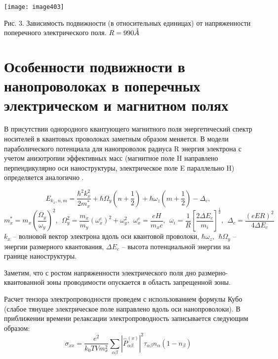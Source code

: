 \texttt{[image: image403]}

\noindent Рис. 3. Зависимость подвижности (в относительных единицах) от напряженности поперечного электрического поля. $R=990 \AA$



\section{Особенности подвижности в нанопроволоках в поперечных электрическом и магнитном полях} \label{sect4_3}

В присутствии однородного квантующего магнитного поля энергетический спектр носителей в квантовых проволоках заметным образом меняется. В модели параболического потенциала для нанопроволок радиуса R энергия электрона с учетом анизотропии эффективных масс (магнитное поле H  направлено перпендикулярно оси наноструктуры, электрическое поле E параллельно H) определяется аналогично \cite{Geiler1998}.

\begin{equation} \label{eq:43_10}
	E_{k_x,n,m}=\frac{{\hbar }^2k^2_x}{2m^*_x}+\hbar {\Omega }_y\left(n+\frac{1}{2}\right)+\hbar {\omega }_z\left(m+\frac{1}{2}\right)-{\Delta }_c,   
\end{equation}
\[
m^*_x=m_x{\left(\frac{{\Omega }_y}{{\omega }_y}\right)}^2,\ \ {\Omega }^2_y=\frac{m_x}{m_y}{\left({\omega }^c_x\right)}^2+{\omega }^2_y,\ \ {\omega }^c_x=\frac{eH}{m_xc},\ \ {\omega }_i=\frac{1}{R}{\left[\frac{2\Delta E_c}{m_i}\right]}^{\frac{1}{2}},\ \ {\Delta }_c=\frac{{\left(eER\right)}^2}{4\Delta E_c}
\]
$k_x$ -- волновой вектор электрона вдоль оси квантовой проволоки, $\hbar {\omega }_z,\ \ \hbar {\Omega }_y$ -- энергии размерного квантования, $\Delta E_c$ -- высота потенциальной энергии на границе наноструктуры.

Заметим, что с ростом напряженности электрического поля дно размерно-квантованной зоны проводимости опускается в область запрещенной зоны.

Расчет тензора электропроводности проведем с использованием формулы Кубо
\cite{Kubo1957a} (слабое тянущее электрическое поле направлено вдоль оси нанопроволоки). В приближении времени релаксации \cite{Khamidullin2002} электропроводность записывается следующим образом:
\begin{equation} \label{eq:43_20}
{\sigma }_{xx}=\frac{e^2}{k_0TVm^2_x}\sum_{\alpha \beta }{{\left|{\hat{P}}^{\left(x\right)}_{\alpha \beta }\right|}^2{\tau }_{\alpha \beta }n_{\alpha }\left(1-n_{\beta }\right)}
\end{equation}

